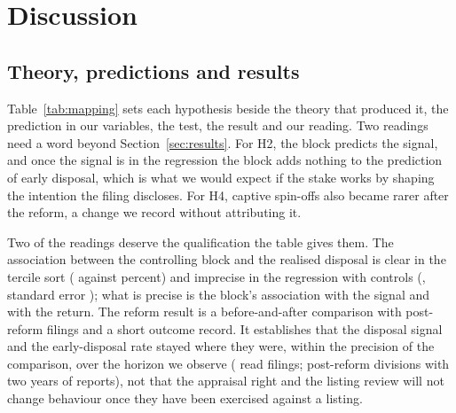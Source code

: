 \section{Discussion}\label{sec:discussion}

\subsection{Theory, predictions and results}\label{sec:mapping}

Table~\ref{tab:mapping} sets each hypothesis beside the theory that produced it, the prediction in our variables, the test, the result and our reading. Two readings need a word beyond Section~\ref{sec:results}. For H2, the block predicts the signal, and once the signal is in the regression the block adds nothing to the prediction of early disposal, which is what we would expect if the stake works by shaping the intention the filing discloses. For H4, captive spin-offs also became rarer after the reform, a change we record without attributing it.

Two of the readings deserve the qualification the table gives them. The association between the controlling block and the realised disposal is clear in the tercile sort (\LowBlockDisp{} against \HighBlockDisp{} percent) and imprecise in the regression with controls (\BlockOnDisposed{}, standard error \BlockOnDisposedSE); what is precise is the block's association with the signal and with the return. The reform result is a before-and-after comparison with \NPostFilings{} post-reform filings and a short outcome record. It establishes that the disposal signal and the early-disposal rate stayed where they were, within the precision of the comparison, over the horizon we observe (\NPostFilings{} read filings; \NPostOutcomes{} post-reform divisions with two years of reports), not that the appraisal right and the listing review will not change behaviour once they have been exercised against a listing.

\begin{table}
\centering
\caption{Theory, prediction, test and result}\label{tab:mapping}
{\scriptsize\setlength{\tabcolsep}{3pt}}
\end{table}

